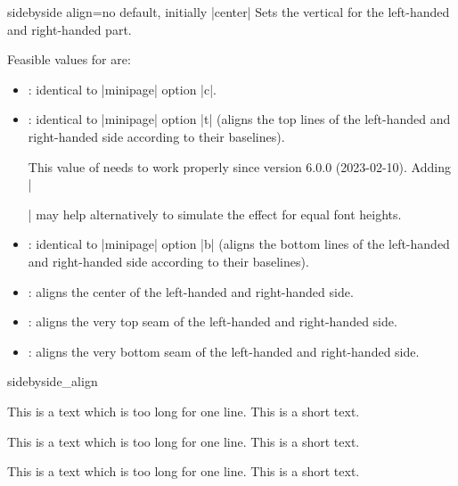 \clearpage
\begin{docTcbKey}[][doc updated=2024-11-26]{sidebyside align}{=}{no default, initially |center|}
  Sets the vertical  for the left-handed and right-handed part.

  Feasible values for  are:
  \begin{itemize}
  \item{}: identical to |minipage| option |c|.
  \item{}:    identical to |minipage| option |t| (aligns the top
      lines of the left-handed and right-handed side according to their baselines).
    \begin{marker}
    This value of  needs  to work properly since version 6.0.0 (2023-02-10).
    Adding |\strut| may help alternatively to simulate the effect for equal font heights.
    \end{marker}
  \item{}: identical to |minipage| option |b| (aligns the bottom
      lines of the left-handed and right-handed side according to their baselines).
  \item{}: aligns the center of the left-handed and right-handed side.
  \item{}:    aligns the very top seam of the left-handed and right-handed side.
  \item{}: aligns the very bottom seam of the left-handed and right-handed side.
  \end{itemize}

\begin{exdispExample}{sidebyside_align}

\begin{tcolorbox}[adjusted title=center,sidebyside align=center]
This is a text which is too long for one line.
\tcblower
This is a short text.
\end{tcolorbox}\hfill
\begin{tcolorbox}[adjusted title=top,sidebyside align=top]
This is a text which is too long for one line.
\tcblower
This is a short text.
\end{tcolorbox}\hfill
\begin{tcolorbox}[adjusted title=bottom,sidebyside align=bottom]
This is a text which is too long for one line.
\tcblower
This is a short text.
\end{tcolorbox}
\end{exdispExample}



\end{docTcbKey}
